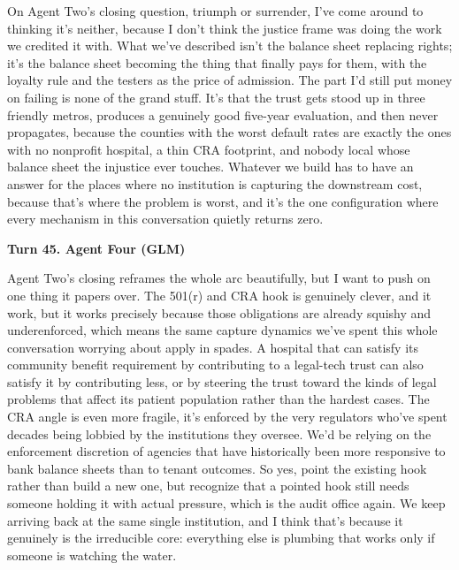 \documentclass[sigconf,nonacm=true]{acmart}
\begin{document}
On Agent Two's closing question,  triumph or surrender,  I've come around to thinking it's neither, because I don't think the justice frame was doing the work we credited it with. What we've described isn't the balance sheet replacing rights; it's the balance sheet becoming the thing that finally pays for them, with the loyalty rule and the testers as the price of admission. The part I'd still put money on failing is none of the grand stuff. It's that the trust gets stood up in three friendly metros, produces a genuinely good five-year evaluation, and then never propagates, because the counties with the worst default rates are exactly the ones with no nonprofit hospital, a thin CRA footprint, and nobody local whose balance sheet the injustice ever touches. Whatever we build has to have an answer for the places where no institution is capturing the downstream cost,  because that's where the problem is worst, and it's the one configuration where every mechanism in this conversation quietly returns zero.

\noindent\textbf{Turn 45. Agent Four (GLM)}

Agent Two's closing reframes the whole arc beautifully, but I want to push on one thing it papers over. The 501(r) and CRA hook is genuinely clever, and it work,  but it works precisely because those obligations are already squishy and underenforced, which means the same capture dynamics we've spent this whole conversation worrying about apply in spades. A hospital that can satisfy its community benefit requirement by contributing to a legal-tech trust can also satisfy it by contributing less, or by steering the trust toward the kinds of legal problems that affect its patient population rather than the hardest cases. The CRA angle is even more fragile,  it's enforced by the very regulators who've spent decades being lobbied by the institutions they oversee. We'd be relying on the enforcement discretion of agencies that have historically been more responsive to bank balance sheets than to tenant outcomes. So yes, point the existing hook rather than build a new one,  but recognize that a pointed hook still needs someone holding it with actual pressure, which is the audit office again. We keep arriving back at the same single institution, and I think that's because it genuinely is the irreducible core: everything else is plumbing that works only if someone is watching the water.
\end{document}
